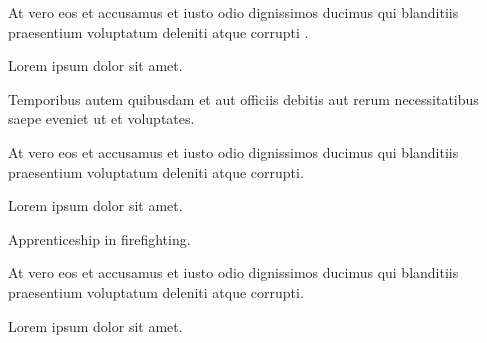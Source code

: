 \documentclass[]{resume}
\begin{document}
\begin{minipage}[t]{0.66\textwidth}
\begin{tightemize}
		\item At vero eos et accusamus et iusto odio dignissimos ducimus qui blanditiis praesentium voluptatum deleniti atque corrupti .
		\item Lorem ipsum dolor sit amet.
		\item Temporibus autem quibusdam et aut officiis debitis aut rerum necessitatibus saepe eveniet ut et voluptates.
		
	\end{tightemize}
	\sectionsep
	\begin{tightemize}
		
	\item At vero eos et accusamus et iusto odio dignissimos ducimus qui blanditiis praesentium voluptatum deleniti atque corrupti.
	\item Lorem ipsum dolor sit amet.
	
	\end{tightemize}
	\sectionsep
	\begin{tightemize}

		\item Apprenticeship in firefighting.
		\item At vero eos et accusamus et iusto odio dignissimos ducimus qui blanditiis praesentium voluptatum deleniti atque corrupti.
		\item Lorem ipsum dolor sit amet.
		
	\end{tightemize}
	\sectionsep
\end{minipage} 
\vfill \vfill \vfill \vfill
\pagebreak


\end{document}
